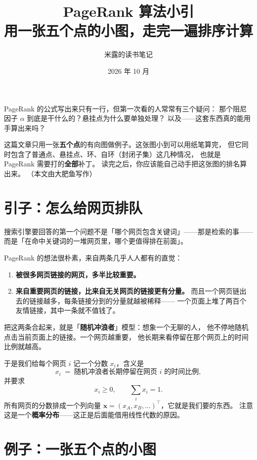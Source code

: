 \documentclass[UTF8,11pt,fontset=macnew]{ctexart}
\title{\bfseries PageRank 算法小引\\[0.35em]
  \large 用一张五个点的小图，走完一遍排序计算}
\author{米露的读书笔记}
\date{2026 年 10 月}
\newcommand{\xv}{\mathbf{x}}
\begin{document}
\maketitle
\pagestyle{plain}
\thispagestyle{empty}

\begin{keybox}[这篇文章想做的事]
PageRank 的公式写出来只有一行，但第一次看的人常常有三个疑问：
那个阻尼因子 $\alpha$ 到底是干什么的？悬挂点为什么要单独处理？
以及——这套东西真的能用手算出来吗？

这篇文章只用一张\textbf{五个点}的有向图做例子。这张图小到可以用纸笔算完，
但它同时包含了普通点、悬挂点、环、自环（封闭子集）这几种情况，
也就是 PageRank 需要打的\textbf{全部}补丁。
读完之后，你应该能自己动手把这张图的排名算出来。
（本文由大肥鱼写作）
\end{keybox}

\section{引子：怎么给网页排队}

搜索引擎要回答的第一个问题不是「哪个网页包含关键词」——那是检索的事——
而是「在命中关键词的一堆网页里，哪个更值得排在前面」。

PageRank 的想法很朴素，来自两条几乎人人都有的直觉：

\begin{enumerate}
  \item \textbf{被很多网页链接的网页，多半比较重要。}
  \item \textbf{来自重要网页的链接，比来自无关网页的链接更有分量。}
        而且一个网页链出去的链接越多，每条链接分到的分量就越被稀释——
        一个页面上堆了两百个友情链接，其中一条就不值钱了。
\end{enumerate}

把这两条合起来，就是「\textbf{随机冲浪者}」模型：想象一个无聊的人，
他不停地随机点击当前页面上的链接。一个网页越重要，
他长期来看停留在那个网页上的时间比例就越高。

于是我们给每个网页 $i$ 记一个分数 $x_i$，含义是
\[
x_i \;=\; \text{随机冲浪者长期停留在网页 } i \text{ 的时间比例},
\]
并要求
\[
x_i \ge 0, \qquad \sum_i x_i = 1 .
\]
所有网页的分数排成一个列向量 $\xv=(x_A,x_B,\dots)^\top$，它就是我们要的东西。
注意这是一个\textbf{概率分布}——这正是后面能借用线性代数的原因。

\section{例子：一张五个点的小图}
\end{document}
